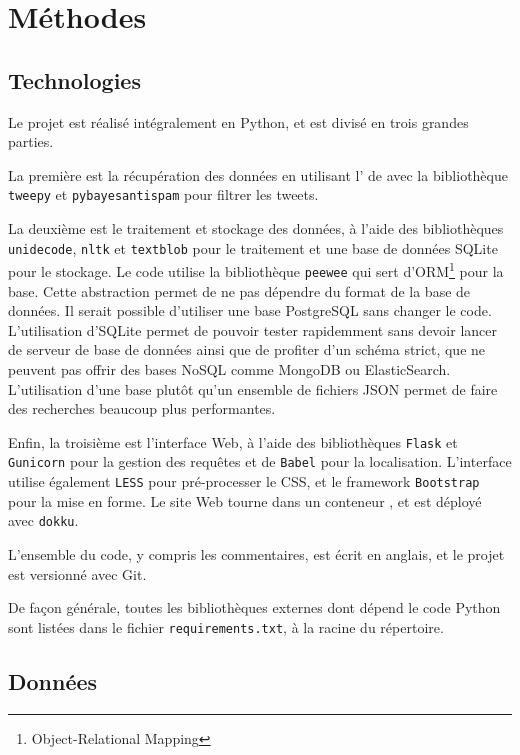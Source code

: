 
\section{Méthodes}

\subsection{Technologies}

Le projet est réalisé intégralement en Python, et est divisé en trois grandes
parties.

La première est la récupération des données en utilisant l’\api{} de \twt{}
avec la bibliothèque \verb|tweepy| et \verb|pybayesantispam| pour filtrer les
tweets.

La deuxième est le traitement et stockage des données, à l’aide des
bibliothèques \verb|unidecode|, \verb|nltk| et \verb|textblob| pour le
traitement et une base de données SQLite pour le stockage. Le code utilise la
bibliothèque \verb|peewee| qui sert d’ORM\footnote{Object-Relational Mapping}
pour la base. Cette abstraction permet de ne pas dépendre du format de la base
de données. Il serait possible d’utiliser une base PostgreSQL sans changer le
code. L’utilisation d’SQLite permet de pouvoir tester rapidemment sans devoir
lancer de serveur de base de données ainsi que de profiter d’un schéma strict,
que ne peuvent pas offrir des bases NoSQL comme MongoDB ou ElasticSearch.
L’utilisation d’une base plutôt qu’un ensemble de fichiers JSON permet de faire
des recherches beaucoup plus performantes.

Enfin, la troisième est l’interface Web, à l’aide des bibliothèques
\verb|Flask| et \verb|Gunicorn| pour la gestion des requêtes et de \verb|Babel|
pour la localisation. L’interface utilise
également \verb|LESS| pour pré-processer le CSS, et le framework
\verb|Bootstrap| pour la mise en forme. Le site Web tourne dans un conteneur
, et est déployé avec \verb|dokku|.

L’ensemble du code, y compris les commentaires, est écrit en anglais, et le
projet est versionné avec Git.

De façon générale, toutes les bibliothèques externes dont dépend le code Python
sont listées dans le fichier \verb|requirements.txt|, à la racine du
répertoire.

\subsection{Données}

